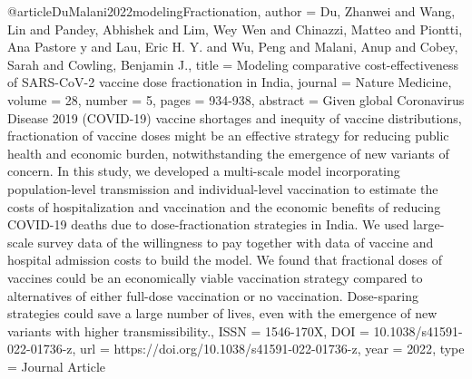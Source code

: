 {{{@article{DuMalani2022modelingFractionation,
   author = {Du, Zhanwei and Wang, Lin and Pandey, Abhishek and Lim, Wey Wen and Chinazzi, Matteo and Piontti, Ana Pastore y and Lau, Eric H. Y. and Wu, Peng and Malani, Anup and Cobey, Sarah and Cowling, Benjamin J.},
   title = {Modeling comparative cost-effectiveness of SARS-CoV-2 vaccine dose fractionation in India},
   journal = {Nature Medicine},
   volume = {28},
   number = {5},
   pages = {934-938},
   abstract = {Given global Coronavirus Disease 2019 (COVID-19) vaccine shortages and inequity of vaccine distributions, fractionation of vaccine doses might be an effective strategy for reducing public health and economic burden, notwithstanding the emergence of new variants of concern. In this study, we developed a multi-scale model incorporating population-level transmission and individual-level vaccination to estimate the costs of hospitalization and vaccination and the economic benefits of reducing COVID-19 deaths due to dose-fractionation strategies in India. We used large-scale survey data of the willingness to pay together with data of vaccine and hospital admission costs to build the model. We found that fractional doses of vaccines could be an economically viable vaccination strategy compared to alternatives of either full-dose vaccination or no vaccination. Dose-sparing strategies could save a large number of lives, even with the emergence of new variants with higher transmissibility.},
   ISSN = {1546-170X},
   DOI = {10.1038/s41591-022-01736-z},
   url = {https://doi.org/10.1038/s41591-022-01736-z},
   year = {2022},
   type = {Journal Article}
}

}}}
